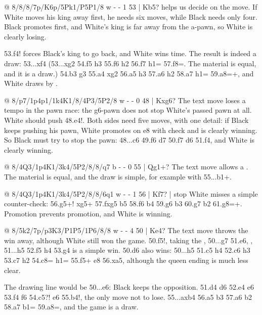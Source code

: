 @ 8/8/8/7p/K6p/5Pk1/P5P1/8 w - - 1 53 | Kb5?
 helps us decide on the move. If White moves
his king away first, he needs six moves, while Black needs only four. Black promotes first, and
White's king is far away from the a-pawn, so White is clearly losing.

53.f4! forces Black's king to go back, and White wins time. The result is indeed a draw: 53...\K xf4
(53...\K xg2 54.f5 h3 55.f6 h2 56.f7 h1=\Q{} 57.f8=\Q{}. The material is equal, and it is a draw.)
54.\K b3 \K g3 55.a4 \K xg2 56.a5 h3 57.a6 h2 58.a7 h1=\Q{} 59.a8=\Q+, and White draws by
.

@ 8/p7/1p4p1/1k4K1/8/4P3/5P2/8 w - - 0 48 | Kxg6?
The text move loses a tempo in the pawn race: the g6-pawn does not stop White's passed pawn at all.
White should push 48.e4!. Both sides need five moves, with one detail: if Black keeps pushing his
pawn, White promotes on e8 with check and is clearly winning.
So Black must try to stop the pawn: 48...\K c6 49.\K f6 \K d7 50.\K f7 \K d6 51.f4, and White is
clearly winning.

@ 8/4Q3/1p4K1/3k4/5P2/8/8/q7 b - - 0 55 | Qg1+?
The text move allows a . The material is equal,
and the draw is simple, for example with 55...\Q b1+.

@ 8/4Q3/1p4K1/3k4/5P2/8/8/6q1 w - - 1 56 | Kf7? | stop
White misses a simple counter-check: 56.\Q g5+! \Q xg5+ 57.fxg5 b5 58.\K f6 b4 59.g6 b3 60.g7 b2
61.g8=\Q+. Promotion prevents promotion, and White is
winning.

@ 8/5k2/7p/p3K3/P1P5/1P6/8/8 w - - 4 50 | Ke4?
The text move throws the win away, although White still won the game. 50.\K f5!, taking the
, 50...\K g7 51.\K e6,
, 51...h5 52.\K f5 h4 53.\K g4 is a simple
win. 50.\K d6 also wins: 50...h5 51.c5 h4 52.c6 h3 53.c7 h2 54.c8=\Q{} h1=\Q{} 55.\Q f5+ \K e8
56.\Q xa5, although the queen ending is much less clear.

The drawing line would be 50...\K e6: Black keeps the opposition. 51.\K d4 \K d6 52.\K e4 \K e6
53.\K f4 \K f6 54.c5?! \K e6 55.b4!, the only move not to lose. 55...axb4 56.a5 b3 57.a6 b2 58.a7
b1=\Q{} 59.a8=\Q{}, and the game is a draw.

